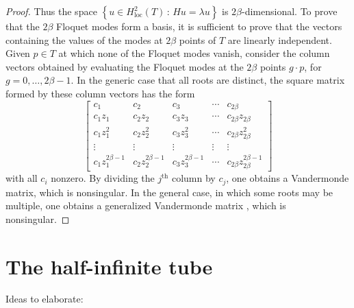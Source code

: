 \documentclass[12pt]{article}
\newcommand{\Hloc}{H^2_\text{loc}}
\begin{document}
\begin{proof}
Thus the space $\left\{ u\in\Hloc(T) \,:\, Hu = \lambda u \right\}$ is $2\beta$-dimensional.  To prove that the $2\beta$ Floquet modes form a basis, it is sufficient to prove that the vectors containing the values of the modes at $2\beta$ points of $T$ are linearly independent.  Given $p\in T$ at which none of the Floquet modes vanish, consider the column vectors obtained by evaluating the Floquet modes at the $2\beta$ points $g\!\cdot\! p$, for $g=0,\dots,2\beta-1$.  In the generic case that all roots are distinct, the square matrix formed by these column vectors has the form
%
\begin{equation}
  \renewcommand{\arraystretch}{1.1}
\left[
\begin{array}{lllll}
  c_1 & c_2 & c_3 & \cdots & c_{2\beta} \\
  c_1z_1 & c_2z_2 & c_3z_3 & \cdots & c_{2\beta}z_{2\beta} \\
  c_1z_1^2 & c_2z_2^2 & c_3z_3^2 & \cdots & c_{2\beta}z_{2\beta}^2 \\
  \vdots & \vdots & \vdots & \vdots & \vdots \\
  c_1z_1^{2\beta-1} & c_2z_2^{2\beta-1} & c_3z_3^{2\beta-1} & \cdots & c_{2\beta}z_{2\beta}^{2\beta-1}
\end{array}
\right]
\end{equation}
%
with all $c_i$ nonzero.  By dividing the $j^\text{th}$ column by $c_j$, one obtains a Vandermonde matrix, which is nonsingular.  In the general case, in which some roots may be multiple, one obtains a generalized Vandermonde matrix \cite{Sobczyk2002}, which is nonsingular.
\end{proof}


\section{The half-infinite tube}\label{sec:HalfTube} %

Ideas to elaborate:
\end{document}
